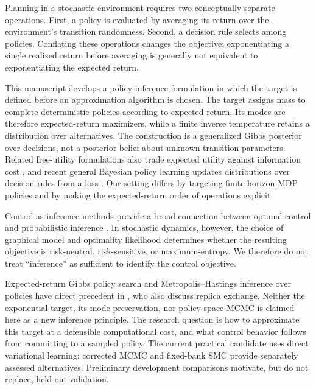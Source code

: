 \label{sec:introduction}

Planning in a stochastic environment requires two conceptually separate
operations. First, a policy is evaluated by averaging its return over the
environment's transition randomness. Second, a decision rule selects among
policies. Conflating these operations changes the objective: exponentiating a
single realized return before averaging is generally not equivalent to
exponentiating the expected return.

This manuscript develops a policy-inference formulation in which the target is
defined before an approximation algorithm is chosen.  The target assigns mass
to complete deterministic policies according to expected return.  Its modes
are therefore expected-return maximizers, while a finite inverse temperature
retains a distribution over alternatives.  The construction is a generalized
Gibbs posterior over decisions, not a posterior belief about unknown transition
parameters.  Related free-utility formulations also trade expected utility
against information cost \citep{ortegaBraun2011}, and recent general Bayesian
policy learning updates distributions over decision rules from a loss
\citep{kato2026}.  Our setting differs by targeting finite-horizon MDP policies
and by making the expected-return order of operations explicit.

Control-as-inference methods provide a broad connection between optimal
control and probabilistic inference \citep{levine2018}.  In stochastic
dynamics, however, the choice of graphical model and optimality likelihood
determines whether the resulting objective is risk-neutral, risk-sensitive, or
maximum-entropy.  We therefore do not treat ``inference'' as sufficient to
identify the control objective.

Expected-return Gibbs policy search and Metropolis--Hastings inference over
policies have direct precedent in \citet{wingateEtAl2011}, who also discuss
replica exchange. Neither the exponential target, its mode preservation, nor
policy-space MCMC is claimed here as a new inference principle. The research
question is how to approximate this target at a defensible computational cost,
and what control behavior follows from committing to a sampled policy. The
current practical candidate uses direct variational learning; corrected MCMC
and fixed-bank SMC provide separately assessed alternatives. Preliminary
development comparisons motivate, but do not replace, held-out validation.

